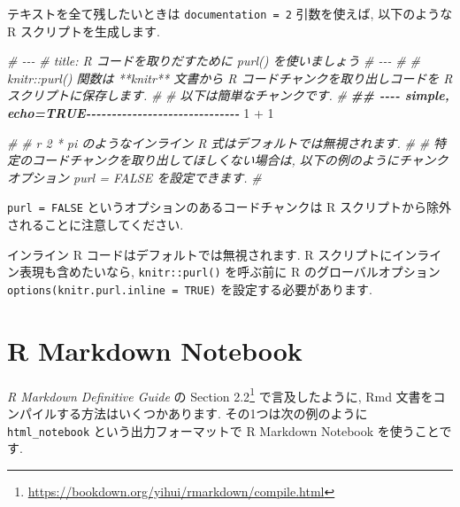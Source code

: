\documentclass[
  11pt,
  lualatex,ja=standard,jafont=noto]{bxjsreport}
\newenvironment{Shaded}{\begin{snugshade}}{\end{snugshade}}
\newcommand{\CommentTok}[1]{\textcolor[rgb]{0.56,0.35,0.01}{\textit{#1}}}
\newcommand{\DecValTok}[1]{\textcolor[rgb]{0.00,0.00,0.81}{#1}}
\newcommand{\DocumentationTok}[1]{\textcolor[rgb]{0.56,0.35,0.01}{\textbf{\textit{#1}}}}
\newcommand{\SpecialCharTok}[1]{\textcolor[rgb]{0.00,0.00,0.00}{#1}}
\renewcommand{\href}[2]{#2\footnote{\url{#1}}}
\begin{document}
テキストを全て残したいときは \texttt{documentation = 2} 引数を使えば, 以下のような R スクリプトを生成します.

\begin{Shaded}
\begin{Highlighting}[]
\CommentTok{\#\textquotesingle{} {-}{-}{-}}
\CommentTok{\#\textquotesingle{} title: R コードを取りだすために \textasciigrave{}purl()\textasciigrave{} を使いましょう}
\CommentTok{\#\textquotesingle{} {-}{-}{-}}
\CommentTok{\#\textquotesingle{} }
\CommentTok{\#\textquotesingle{} \textasciigrave{}knitr::purl()\textasciigrave{} 関数は **knitr** 文書から  R コードチャンクを取り出しコードを R スクリプトに保存します.}
\CommentTok{\#\textquotesingle{} }
\CommentTok{\#\textquotesingle{} 以下は簡単なチャンクです.}
\CommentTok{\#\textquotesingle{} }
\DocumentationTok{\#\# {-}{-}{-}{-} simple, echo=TRUE{-}{-}{-}{-}{-}{-}{-}{-}{-}{-}{-}{-}{-}{-}{-}{-}{-}{-}{-}{-}{-}{-}{-}{-}{-}{-}{-}{-}{-}{-}}
\DecValTok{1} \SpecialCharTok{+} \DecValTok{1}

\CommentTok{\#\textquotesingle{} }
\CommentTok{\#\textquotesingle{} \textasciigrave{}r 2 * pi\textasciigrave{} のようなインライン R 式はデフォルトでは無視されます.}
\CommentTok{\#\textquotesingle{} }
\CommentTok{\#\textquotesingle{} 特定のコードチャンクを取り出してほしくない場合は, 以下の例のようにチャンクオプション \textasciigrave{}purl = FALSE\textasciigrave{} を設定できます. }
\CommentTok{\#\textquotesingle{} }
\end{Highlighting}
\end{Shaded}

\texttt{purl = FALSE} というオプションのあるコードチャンクは R スクリプトから除外されることに注意してください.

インライン R コードはデフォルトでは無視されます. R スクリプトにインライン表現も含めたいなら, \texttt{knitr::purl()} を呼ぶ前に R のグローバルオプション \texttt{options(knitr.purl.inline = TRUE)} を設定する必要があります.

\hypertarget{notebook}{%
\section{R Markdown Notebook}\label{notebook}}

\emph{R Markdown Definitive Guide} \autocite{rmarkdown2018} の \href{https://bookdown.org/yihui/rmarkdown/compile.html}{Section 2.2} で言及したように, Rmd 文書をコンパイルする方法はいくつかあります. その1つは次の例のように \texttt{html\_notebook} という出力フォーマットで R Markdown Notebook を使うことです.
\end{document}
